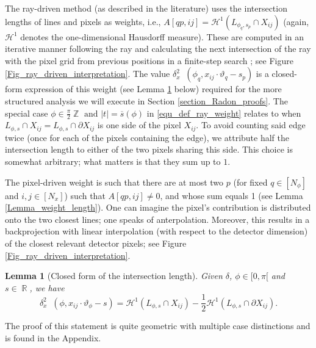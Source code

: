 \documentclass[11pt,reqno]{amsart}
\DeclareMathOperator{\RR}{\mathbb{R}}
\DeclareMathOperator{\ZZ}{\mathbb{Z}}
\DeclareMathOperator{\RayWeight}{\omega^\mathrm{rd}_{\delta_\mathit{x}}}
\numberwithin{theorem}{section}
\newtheorem{lemma}[theorem]{Lemma}
\theoremstyle{remark}
\begin{document}
The ray-driven method (as described in the literature) uses the intersection lengths of lines and pixels as weights, i.e., $A[qp,ij] = \mathcal{H}^1(L_{\phi_q,s_p}\cap X_{ij})$ (again, $\mathcal{H}^1$ denotes the one-dimensional Hausdorff measure). These are computed in an iterative manner following the ray and calculating the next intersection of the ray with the pixel grid from previous positions in a finite-step search  \cite{doi:10.1118/1.4761867}; see Figure \ref{Fig_ray_driven_interpretation}. The value $\delta_x^2 \RayWeight(\phi_q,x_{ij}\cdot\vartheta_q-s_p)$ is a closed-form expression of this weight (see Lemma \ref{Lemma_weight_as_intersection_length} below) required for the more structured analysis we will execute in Section \ref{section_Radon_proofs}. The special case $\phi\in \frac{\pi}{2}\ZZ \text{ and } |t| =\overline s (\phi)$ in \eqref{equ_def_ray_weight} relates to when $L_{\phi,s}\cap X_{ij} = L_{\phi,s}\cap \partial X_{ij}$ is one side of the pixel $X_{ij}$. To avoid counting said edge twice (once for each of the pixels containing the edge), we attribute half the intersection length to either of the two pixels sharing this side. This choice is somewhat arbitrary; what matters is that they sum up to $1$.

The pixel-driven weight is such that there are at most two $p$ (for fixed $q\in [N_\phi]$ and $i,j\in [N_x]$) such that $A[qp,ij]\neq 0$, and whose sum equals 1 (see Lemma \ref{Lemma_weight_length}). One can imagine the pixel's contribution is distributed onto the two closest lines; one speaks of anterpolation. Moreover, this results in a backprojection with linear interpolation (with respect to the detector dimension) of the closest relevant detector pixels; see Figure \ref{Fig_ray_driven_interpretation}.



\begin{lemma}[Closed form of the intersection length]
\label{Lemma_weight_as_intersection_length}
Given $\delta$, $\phi \in [0,\pi[$ and $s \in \RR$,
we have 
\begin{equation} \label{equ_lemma_intersectionlength}
\delta_x^2 \RayWeight(\phi,x_{ij}\cdot \vartheta_\phi - s)= \mathcal{H}^1(L_{\phi,s}\cap X_{ij}) - \frac 1 2 \mathcal{H}^1(L_{\phi,s}\cap \partial X_{ij}) .
\end{equation}
\end{lemma}
The proof of this statement is quite geometric with multiple case distinctions and is found in the Appendix.
\end{document}
